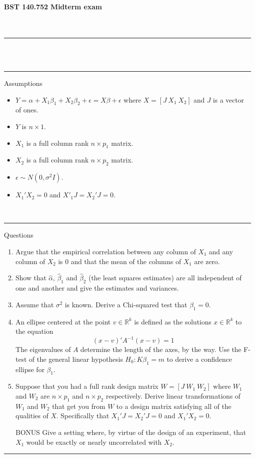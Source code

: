 \documentclass[12pt]{article}
\begin{document}
\noindent
{\bf BST 140.752 Midterm exam}  \\ \ \\ \ \\
\hrule
{}
\\ \ \\
\hrule

\noindent Assumptions
\begin{itemize}
\item $Y = \alpha + X_1 \beta_1 + X_2 \beta_2 + \epsilon = X \beta + \epsilon$ where $X = [J ~ X_1 ~ X_2]$ and $J$ is a vector of ones.
\item $Y$ is $n\times 1$.
\item $X_1$ is a full column rank $n\times p_1$ matrix.
\item $X_2$ is a full column rank $n\times p_2$ matrix.
\item $\epsilon \sim N(0,\sigma^2 I)$.
\item  $X_1' X_2 = 0$ and $X'_1 J = X_2' J = 0$.
\end{itemize}
\ \\ 
\hrule 
\noindent Questions
\begin{enumerate}[1.]
\item Argue that the empirical correlation between any column of $X_1$
  and any column of $X_2$ is 0 and that the mean of the columns of $X_1$ are zero. 
\item Show that
$\hat \alpha$, $\hat \beta_1$ and $\hat \beta_2$ (the least squares estimates) are all independent of one and another and give the estimates and variances.
\item Assume that $\sigma^2$ is known. Derive a Chi-squared test that $\beta_1 = 0$. 
\item An ellipse centered at the point $v \in \mathbb{R}^k$ is defined as the 
solutions $x\in \mathbb{R}^k$ to the equation $$(x - v)' A^{-1} (x - v) = 1$$ 
The eigenvalues of $A$ determine the length of the axes, by the way. 
Use the F-test of the general linear hypothesis $H_0: K\beta_1 = m$ to derive a confidence ellipse for $\beta_1$.
\item Suppose that you had a full rank design matrix $W = [J ~ W_1 ~ W_2]$ where
$W_1$ and $W_2$ are $n\times p_1$ and $n \times p_2$ respectively. Derive linear transformations of $W_1$ and $W_2$ that get you from $W$ to a design
matrix satisfying all of the qualities of $X$. Specifically that $X_1' J = X_2' J = 0$ and $X_1'X_2 = 0$.
\item [BONUS] Give a setting where, by virtue of the design of an experiment, that $X_1$ would be exactly or nearly uncorrelated with $X_2$.
\end{enumerate}
\hrule

\end{document}
